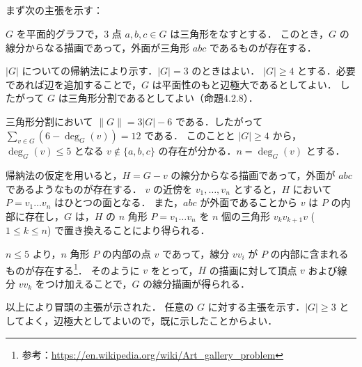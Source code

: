 \subsection{}
まず次の主張を示す：

$G$ を平面的グラフで，$3$ 点 $a,b,c\in G$ は三角形をなすとする．
このとき，$G$ の線分からなる描画であって，外面が三角形 $abc$ であるものが存在する．

$|G|$ についての帰納法により示す．$|G| = 3$ のときはよい．
$|G|\geq 4$ とする．必要であれば辺を追加することで，$G$ は平面性のもと辺極大であるとしてよい．
したがって $G$ は三角形分割であるとしてよい（命題4.2.8）．

三角形分割において $\|G\| = 3|G| - 6$ である．したがって $\sum_{v\in G}(6 - \deg_G(v)) = 12$ である．
このことと $|G|\geq 4$ から，$\deg_G(v)\leq 5$ となる $v\notin \{a,b,c\}$ の存在が分かる．$n = \deg_G(v)$ とする．

帰納法の仮定を用いると，$H = G - v$ の線分からなる描画であって，外面が $abc$ であるようなものが存在する．
$v$ の近傍を $v_1,\ldots,v_n$ とすると，$H$ において $P = v_1\ldots v_n$ はひとつの面となる．
また，$abc$ が外面であることから $v$ は $P$ の内部に存在し，$G$ は，$H$ の $n$ 角形 $P = v_1\ldots v_n$ を $n$ 個の三角形 $v_kv_{k+1}v$ ($1\leq k\leq n$) で置き換えることにより得られる．

$n\leq 5$ より，$n$ 角形 $P$ の内部の点 $v$ であって，線分 $vv_i$ が $P$ の内部に含まれるものが存在する\footnote{参考：\url{https://en.wikipedia.org/wiki/Art_gallery_problem}}．
そのように $v$ をとって，$H$ の描画に対して頂点 $v$ および線分 $vv_k$ をつけ加えることで，$G$ の線分描画が得られる．

以上により冒頭の主張が示された．
任意の $G$ に対する主張を示す．$|G|\geq 3$ としてよく，辺極大としてよいので，既に示したことからよい．


